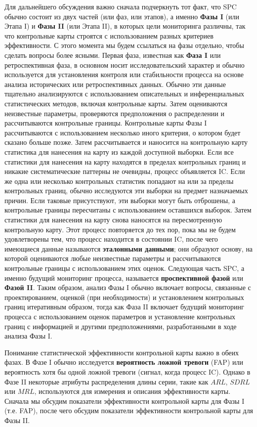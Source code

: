 Для дальнейшего обсуждения важно сначала подчеркнуть тот факт, что SPC обычно состоит из двух частей (или фаз, или этапов), а именно \textbf{Фазы I} (или Этапа I) и \textbf{Фазы II} (или Этапа II), в которых цели мониторинга различны, так что контрольные карты строятся с использованием разных критериев эффективности. С этого момента мы будем ссылаться на фазы отдельно, чтобы сделать вопросы более ясными. Первая фаза, известная как \textbf{Фаза I} или ретроспективная фаза, в основном носит исследовательский характер и обычно используется для установления контроля или стабильности процесса на основе анализа исторических или ретроспективных данных. Обычно эти данные тщательно анализируются с использованием описательных и инференциальных статистических методов, включая контрольные карты. Затем оцениваются неизвестные параметры, проверяются предположения о распределении и рассчитываются контрольные границы. Контрольные карты Фазы I рассчитываются с использованием несколько иного критерия, о котором будет сказано больше позже. Затем рассчитывается и наносится на контрольную карту статистика для нанесения на карту из каждой доступной выборки. Если все статистики для нанесения на карту находятся в пределах контрольных границ и никакие систематические паттерны не очевидны, процесс объявляется IC. Если же одна или несколько контрольных статистик попадают на или за пределы контрольных границ, обычно исследуются эти выборки на предмет назначаемых причин. Если таковые присутствуют, эти выборки могут быть отброшены, а контрольные границы пересчитаны с использованием оставшихся выборок. Затем статистики для нанесения на карту снова наносятся на пересмотренную контрольную карту. Этот процесс повторяется до тех пор, пока мы не будем удовлетворены тем, что процесс находится в состоянии IC, после чего имеющиеся данные называются \textbf{эталонными данными}; они образуют основу, на которой оцениваются любые неизвестные параметры и рассчитываются контрольные границы с использованием этих оценок. Следующая часть SPC, а именно будущий мониторинг процесса, называется \textbf{проспективной фазой} или \textbf{Фазой II}. Таким образом, анализ Фазы I обычно включает вопросы, связанные с проектированием, оценкой (при необходимости) и установлением контрольных границ итеративным образом, тогда как Фаза II включает будущий мониторинг процесса с использованием оценок параметров и установление контрольных границ с информацией и другими предположениями, разработанными в ходе анализа Фазы I.

Понимание статистической эффективности контрольной карты важно в обеих фазах. В Фазе I обычно исследуется \textbf{вероятность ложной тревоги} (FAP) или вероятность хотя бы одной ложной тревоги (сигнал, когда процесс IC). Однако в Фазе II некоторые атрибуты распределения длины серии, такие как \(ARL\), \(SDRL\) или \(MRL\), используются для измерения и описания эффективности карты. Сначала мы обсудим показатели эффективности контрольной карты для Фазы I (т.е. FAP), после чего обсудим показатели эффективности контрольной карты для Фазы II.

